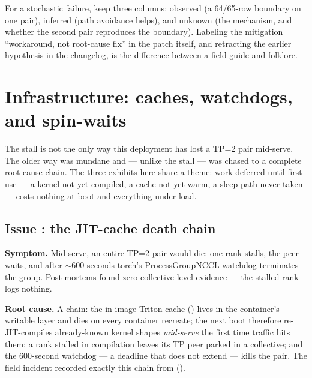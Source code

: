 \begin{hblesson}
For a stochastic failure, keep three columns: observed (a 64/65-row boundary
on one pair), inferred (path avoidance helps), and unknown (the mechanism,
and whether the second pair reproduces the boundary). Labeling the mitigation
``workaround, not root-cause fix'' in the patch itself, and retracting the
earlier hypothesis in the changelog, is the difference between a field guide
and folklore.
\end{hblesson}

\section{Infrastructure: caches, watchdogs, and spin-waits}
\label{sec:bugs-infra}

The  stall is not the only way this deployment has lost a TP=2
pair mid-serve. The older way was mundane and --- unlike the stall --- was
chased to a complete root-cause chain. The three exhibits here share a
theme: work deferred until first use --- a kernel not yet compiled, a cache
not yet warm, a sleep path never taken --- costs nothing at boot and
everything under load.

\subsection{Issue : the JIT-cache death chain}

\textbf{Symptom.} Mid-serve, an entire TP=2 pair would die: one rank stalls,
the peer waits, and after ${\sim}$600 seconds torch's ProcessGroupNCCL
watchdog terminates the group. Post-mortems found zero collective-level
evidence --- the stalled rank logs nothing.

\textbf{Root cause.} A chain: the in-image Triton cache
() lives in the container's writable layer and dies
on every container recreate; the next boot therefore re-JIT-compiles
already-known kernel shapes \emph{mid-serve} the first time traffic hits them;
a rank stalled in compilation leaves its TP peer parked in a collective; and
the 600-second watchdog --- a deadline that
 does not extend --- kills the pair.
The field incident recorded exactly this chain from
 ().

